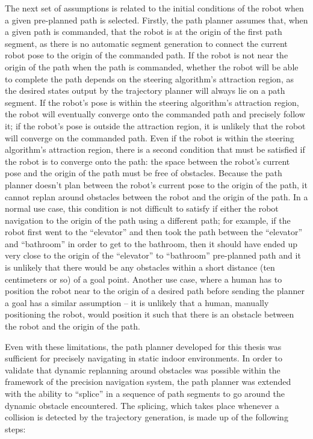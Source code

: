 The next set of assumptions is related to the initial conditions of the robot when a given pre-planned path is selected. Firstly, the path planner assumes that, when a given path is commanded, that the robot is at the origin of the first path segment, as there is no automatic segment generation to connect the current robot pose to the origin of the commanded path. If the robot is not near the origin of the path when the path is commanded, whether the robot will be able to complete the path depends on the steering algorithm's attraction region, as the desired states output by the trajectory planner will always lie on a path segment. If the robot's pose is within the steering algorithm's attraction region, the robot will eventually converge onto the commanded path and precisely follow it; if the robot's pose is outside the attraction region, it is unlikely that the robot will converge on the commanded path. Even if the robot is within the steering algorithm's attraction region, there is a second condition that must be satisfied if the robot is to converge onto the path: the space between the robot's current pose and the origin of the path must be free of obstacles. Because the path planner doesn't plan between the robot's current pose to the origin of the path, it cannot replan around obstacles between the robot and the origin of the path. In a normal use case, this condition is not difficult to satisfy if either the robot navigation to the origin of the path using a different path; for example, if the robot first went to the ``elevator'' and then took the path between the ``elevator'' and ``bathroom'' in order to get to the bathroom, then it should have ended up very close to the origin of the ``elevator'' to ``bathroom'' pre-planned path and it is unlikely that there would be any obstacles within a short distance (ten centimeters or so) of a goal point. Another use case, where a human has to position the robot near to the origin of a desired path before sending the planner a goal has a similar assumption -- it is unlikely that a human, manually positioning the robot, would position it such that there is an obstacle between the robot and the origin of the path.

Even with these limitations, the path planner developed for this thesis was sufficient for precisely navigating in static indoor environments. In order to validate that dynamic replanning around obstacles was possible within the framework of the precision navigation system, the path planner was extended with the ability to ``splice'' in a sequence of path segments to go around the dynamic obstacle encountered. The splicing, which takes place whenever a collision is detected by the trajectory generation, is made up of the following steps:

